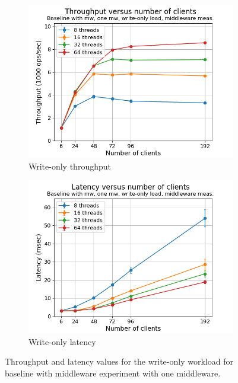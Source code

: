 \documentclass[11pt,a4paper]{article}
\begin{document}
\begin{figure}[h]
\centering
\begin{subfigure}{.5\textwidth}
  \centering
  \includegraphics[width=1.0\linewidth,trim={5px 0px 20px 0px},clip]{img/plot/mwb1-wo-tp_mw.png}
  \caption{Write-only throughput}
  \label{fig:mwb1-wo-tp_mw}
\end{subfigure}%
\begin{subfigure}{.5\textwidth}
  \centering
  \includegraphics[width=1.0\linewidth,trim={5px 0px 20px 0px},clip]{img/plot/mwb1-wo-lat_mw.png}
  \caption{Write-only latency}
  \label{fig:mwb1-wo-lat_mw}
\end{subfigure}
\caption{Throughput and latency values for the write-only workload for baseline with middleware experiment with one middleware.}
\label{fig:mwb1-wo_mw}
\end{figure}
\end{document}
